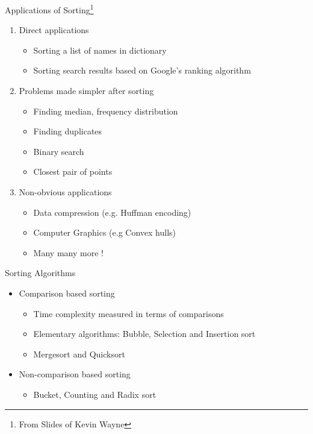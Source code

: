 \documentclass{beamer}
\begin{document}
\begin{frame}{Applications of Sorting\footnote{From Slides of Kevin Wayne}}
\begin{enumerate}
\item Direct applications
\begin{itemize}
    \item Sorting a list of names in dictionary
    \item Sorting search results based on Google's ranking algorithm
\end{itemize}
\item Problems made simpler after sorting
\begin{itemize}
    \item Finding median, frequency distribution
    \item Finding duplicates
    \item Binary search
    \item Closest pair of points
\end{itemize}
\item Non-obvious applications
\begin{itemize}
    \item Data compression (e.g. Huffman encoding)
    \item Computer Graphics (e.g Convex hulls)
    \item Many many more !
\end{itemize}
\end{enumerate}
\end{frame}

\begin{frame}{Sorting Algorithms}
\begin{itemize}
\item Comparison based sorting
\begin{itemize}
\item Time complexity measured in terms of comparisons
\item Elementary algorithms: Bubble, Selection and Insertion sort
\item Mergesort and Quicksort 
\end{itemize}
\item Non-comparison based sorting
\begin{itemize}
\item Bucket, Counting and Radix sort
\end{itemize}
\end{itemize}
\end{frame}
\end{document}

